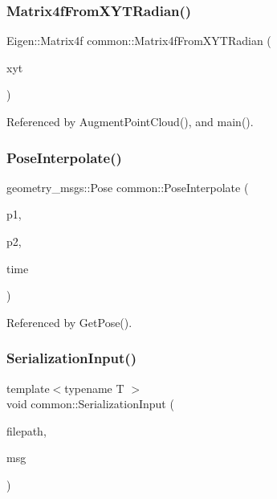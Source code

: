 \mbox{\label{namespacecommon_a43b57f5e12ace94174d0110531826896}} 
\subsubsection{\texorpdfstring{Matrix4f\+From\+X\+Y\+T\+Radian()}{Matrix4fFromXYTRadian()}}
{\footnotesize\ttfamily Eigen\+::\+Matrix4f common\+::\+Matrix4f\+From\+X\+Y\+T\+Radian (\begin{DoxyParamCaption}\item[{const Eigen\+::\+Vector3d \&}]{xyt }\end{DoxyParamCaption})}



Referenced by Augment\+Point\+Cloud(), and main().

\mbox{\label{namespacecommon_a31d70b6febb50afde5fa00fc9a310fe3}} 
\subsubsection{\texorpdfstring{Pose\+Interpolate()}{PoseInterpolate()}}
{\footnotesize\ttfamily geometry\+\_\+msgs\+::\+Pose common\+::\+Pose\+Interpolate (\begin{DoxyParamCaption}\item[{const geometry\+\_\+msgs\+::\+Pose\+Stamped \&}]{p1,  }\item[{const geometry\+\_\+msgs\+::\+Pose\+Stamped \&}]{p2,  }\item[{const ros\+::\+Time \&}]{time }\end{DoxyParamCaption})}



Referenced by Get\+Pose().

\mbox{\label{namespacecommon_aaafeb67e7c22aa1324903d0c2539d310}} 
\subsubsection{\texorpdfstring{Serialization\+Input()}{SerializationInput()}}
{\footnotesize\ttfamily template$<$typename T $>$ \\
void common\+::\+Serialization\+Input (\begin{DoxyParamCaption}\item[{const std\+::string \&}]{filepath,  }\item[{T \&}]{msg }\end{DoxyParamCaption})}



